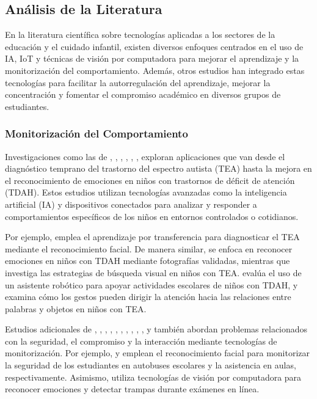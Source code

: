 \documentclass[a4paper,fleqn]{cas-sc}
\begin{document}
		
		\subsection{Análisis de la Literatura}			
			En la literatura científica sobre tecnologías aplicadas a los sectores de la educación y el cuidado infantil, existen diversos enfoques centrados en el uso de IA, IoT y técnicas de visión por computadora para mejorar el aprendizaje y la monitorización del comportamiento. Además, otros estudios han integrado estas tecnologías para facilitar la autorregulación del aprendizaje, mejorar la concentración y fomentar el compromiso académico en diversos grupos de estudiantes.
			
		\subsubsection{Monitorización del Comportamiento}
			Investigaciones como las de \cite{Akter2021}, \cite{Albrecht2014}, \cite{Berrezueta-Guzman2021}, \cite{Pelc2006}, \cite{VilliersRader2021}, \cite{Warren2015Brief}, \cite{Washington2016AWereable} exploran aplicaciones que van desde el diagnóstico temprano del trastorno del espectro autista (TEA) hasta la mejora en el reconocimiento de emociones en niños con trastornos de déficit de atención (TDAH). Estos estudios utilizan tecnologías avanzadas como la inteligencia artificial (IA) y dispositivos conectados para analizar y responder a comportamientos específicos de los niños en entornos controlados o cotidianos.
			
			Por ejemplo, \cite{Akter2021} emplea el aprendizaje por transferencia para diagnosticar el TEA mediante el reconocimiento facial. De manera similar, \cite{Pelc2006} se enfoca en reconocer emociones en niños con TDAH mediante fotografías validadas, mientras que \cite{Albrecht2014} investiga las estrategias de búsqueda visual en niños con TEA. \cite{Berrezueta-Guzman2021} evalúa el uso de un asistente robótico para apoyar actividades escolares de niños con TDAH, y \cite{VilliersRader2021} examina cómo los gestos pueden dirigir la atención hacia las relaciones entre palabras y objetos en niños con TEA.
			
			Estudios adicionales de \cite{Boumiza2017}, \cite{DaCosta2023}, \cite{Enadula2021}, \cite{Farsani2020}, \cite{Hachad2020}, \cite{James2019},  \cite{Kulkarni2023}, \cite{Kumar2024Zoom}, \cite{Muller2018ArchnSmile}, \cite{Narkhede2023}, y \cite{Ozdamli2022} también abordan problemas relacionados con la seguridad, el compromiso y la interacción mediante tecnologías de monitorización. Por ejemplo, \cite{Hachad2020} y \cite{James2019} emplean el reconocimiento facial para monitorizar la seguridad de los estudiantes en autobuses escolares y la asistencia en aulas, respectivamente. Asimismo, \cite{Ozdamli2022} utiliza tecnologías de visión por computadora para reconocer emociones y detectar trampas durante exámenes en línea.
			
\end{document}
